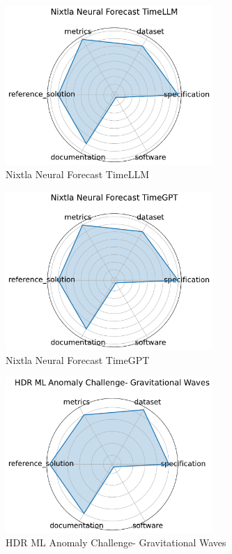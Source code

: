 \documentclass{article}
\begin{document}
\begin{figure}[h!]
  \centering
  \includegraphics[width=0.7\textwidth]{Nixtla Neural Forecast TimeLLM_radar.pdf}
  \caption{Nixtla Neural Forecast TimeLLM \cite{jin2024timellmtimeseriesforecasting}}
\end{figure}

\begin{figure}[h!]
  \centering
  \includegraphics[width=0.7\textwidth]{Nixtla Neural Forecast TimeGPT_radar.pdf}
  \caption{Nixtla Neural Forecast TimeGPT \cite{garza2024timegpt1}}
\end{figure}

\begin{figure}[h!]
  \centering
  \includegraphics[width=0.7\textwidth]{HDR ML Anomaly Challenge- Gravitational Waves_radar.pdf}
  \caption{HDR ML Anomaly Challenge- Gravitational Waves \cite{campolongo2025buildingmachinelearningchallenges}}
\end{figure}
\end{document}
